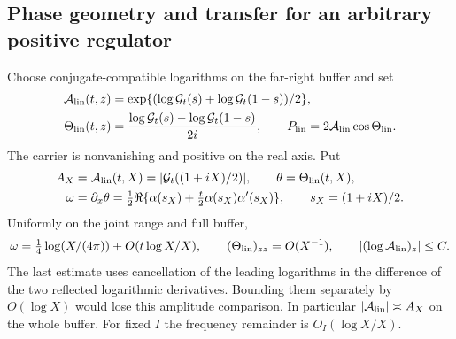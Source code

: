 \subsection{Phase geometry and transfer for an arbitrary positive regulator}
Choose conjugate-compatible logarithms on the far-right buffer and set
\begin{align}
 \mathcal A_{\rm lin}(t,z)&=
 \exp\{(\log\mathcal G_t(s)+\log\mathcal G_t(1-s))/2\},\notag\\
 \Theta_{\rm lin}(t,z)&=
 \frac{\log\mathcal G_t(s)-\log\mathcal G_t(1-s)}{2i},\qquad
 P_{\rm lin}=2\mathcal A_{\rm lin}\cos\Theta_{\rm lin}.
 \label{eq:linear-phase}
\end{align}
The carrier is nonvanishing and positive on the real axis.  Put
\begin{align}
 A_X&=\mathcal A_{\rm lin}(t,X)
      =|\mathcal G_t((1+iX)/2)|,\qquad
 \theta=\Theta_{\rm lin}(t,X),\notag\\
 \omega&=\partial_x\theta
  =\tfrac12\Re\{\alpha(s_X)+\tfrac t2\alpha(s_X)\alpha'(s_X)\},
       \qquad s_X=(1+iX)/2.
 \label{eq:linear-frequency}
\end{align}
Uniformly on the joint range and full buffer,
\begin{equation}
 \omega=\tfrac14\log(X/(4\pi))+O(t\log X/X),\qquad
 (\Theta_{\rm lin})_{zz}=O(X^{-1}),\qquad
 |(\log\mathcal A_{\rm lin})_z|\le C.
 \label{eq:linear-phase-bounds}
\end{equation}
The last estimate uses cancellation of the leading logarithms in the
difference of the two reflected logarithmic derivatives.  Bounding
them separately by $O(\log X)$ would lose this amplitude comparison.
In particular $|\mathcal A_{\rm lin}|\asymp A_X$ on the whole buffer.
For fixed $I$ the frequency remainder is $O_I(\log X/X)$.

